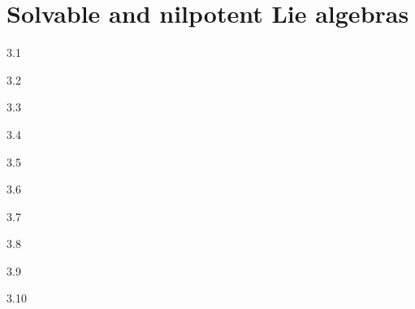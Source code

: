 \chapter{Solvable and nilpotent Lie algebras}

\begin{solution}{}{3.1}
    
\end{solution}

\begin{solution}{}{3.2}

\end{solution}

\begin{solution}{}{3.3}
    
\end{solution}

\begin{solution}{}{3.4}

\end{solution}

\begin{solution}{}{3.5}
    
\end{solution}

\begin{solution}{}{3.6}

\end{solution}

\begin{solution}{}{3.7}
    
\end{solution}

\begin{solution}{}{3.8}

\end{solution}

\begin{solution}{}{3.9}
    
\end{solution}

\begin{solution}{}{3.10}

\end{solution}